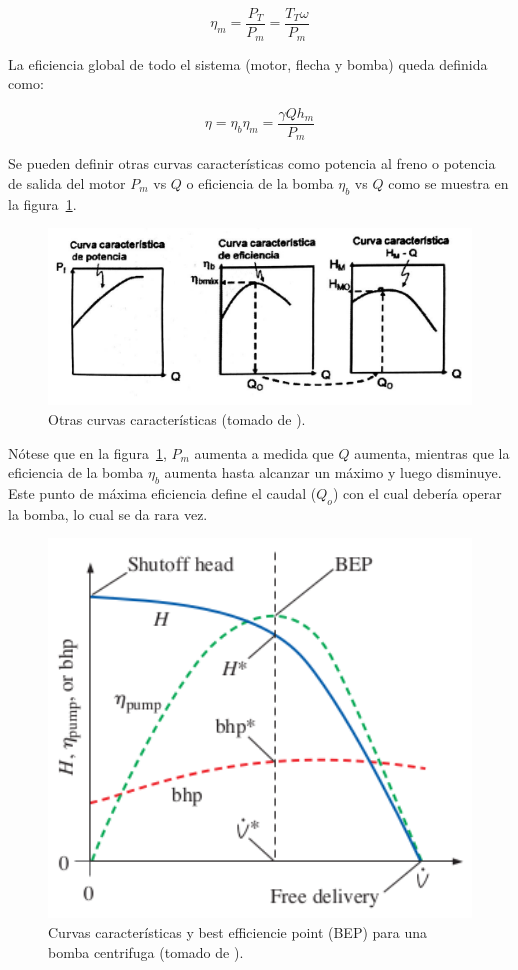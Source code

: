 \documentclass[11pt, oneside]{article}
\begin{document}
\begin{equation}
\eta_m = \frac{P_T}{P_m} = \frac{T_T \omega}{P_m}
\label{bome14}
\end{equation}

La eficiencia global de todo el sistema (motor, flecha y bomba) queda definida como:

\begin{equation}
\eta =\eta_b \eta_m = \frac{\gamma Q h_m}{P_m}
\label{bome15}
\end{equation}

Se pueden definir otras curvas caracter\'isticas como potencia al freno o potencia de salida del motor $P_m$ vs $Q$ o eficiencia de la bomba $\eta_b$ vs $Q$ como se muestra en la figura~\ref{bom5}. 

\begin{figure}[h]
\centering
\includegraphics[width=12cm]{./figs/bom5.jpeg}
\caption{Otras curvas caracter\'isticas (tomado de \cite{agudelo2011mecanica}).} 
\label{bom5}
\end{figure}

N\'otese que en la figura~\ref{bom5}, $P_m$ aumenta a medida que $Q$ aumenta, mientras que la eficiencia de la bomba $\eta_b$ aumenta hasta alcanzar un m\'aximo y luego disminuye. Este punto de m\'axima eficiencia define el caudal ($Q_o$) con el cual deber\'ia operar la bomba, lo cual se da rara vez. 

\begin{figure}[h]
\centering
\includegraphics[width=12cm]{./figs/bom5a.png}
\caption{Curvas caracter\'isticas y best efficiencie point (BEP) para una bomba centrifuga (tomado de \cite{cengel2013ebook}).} 
\label{bom5a}
\end{figure}
\end{document}
